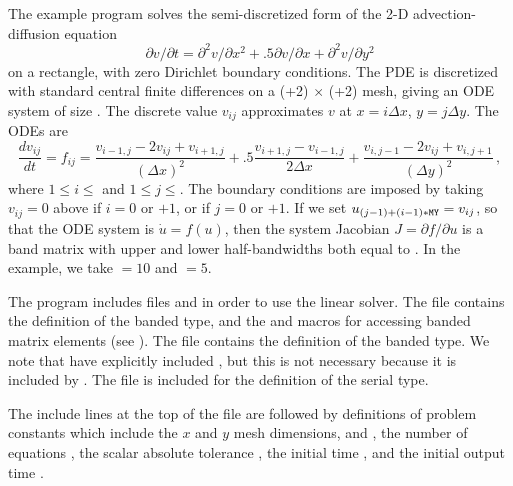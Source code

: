 The example program  solves the semi-discretized form of
the 2-D advection-diffusion equation
\vspace*{-.1in}
\begin{equation}
\label{eq:adeqn}
\partial v / \partial t = \partial^2 v / \partial x^2
  + .5 \partial v / \partial x + \partial^2 v / \partial y^2
\end{equation}
on a rectangle, with zero Dirichlet boundary conditions. The PDE is 
discretized with standard central finite differences on a 
(+2) $\times$ (+2) mesh, giving an ODE system of size
.  The discrete value $v_{ij}$ approximates $v$ at $x = i \Delta x$,
$y = j \Delta y$. The ODEs are
\begin{equation}
\label{eq:cdiff}
\frac{dv_{ij}}{dt} = f_{ij} =
         \frac{v_{i-1,j} - 2 v_{ij} + v_{i+1,j}}{(\Delta x)^2}
       + .5  \frac{v_{i+1,j} - v_{i-1,j}}{2 \Delta x}
       + \frac{v_{i,j-1} - 2 v_{ij} + v_{i,j+1}}{(\Delta y)^2} \, ,
\end{equation}
where $1 \leq i \leq $ and $1 \leq j \leq $.  The boundary
conditions are imposed by taking $v_{ij} = 0$ above if $i = 0$
or $ + 1$, or if $j = 0$ or $ + 1$. 
If we set $u_{(j-1)+(i-1)*{\tt MY}} = v_{ij}$, so that the ODE system is
$\dot{u} = f(u)$, then the system Jacobian $J = \partial f / \partial u$ is
a band matrix with upper and lower half-bandwidths both equal to .
In the example, we take  $= 10$ and  $= 5$.

The  program includes files
 and  in order to use the
{\sunlinsolband} linear solver. The  file
contains the definition of the banded {\sunmatrix} type, and the
 and  macros for
accessing banded matrix elements (see ).  The
 file contains the definition of the banded
{\sunlinsol} type.  We note that have explicitly included
, but this is not necessary because it is
included by .  The file 
is included for the definition of the serial  type. 

The include lines at the top of the file are followed by definitions of
problem constants which include the $x$ and $y$ mesh dimensions,  and
, the number of equations , the scalar absolute tolerance
, the initial time , and the initial output time .

